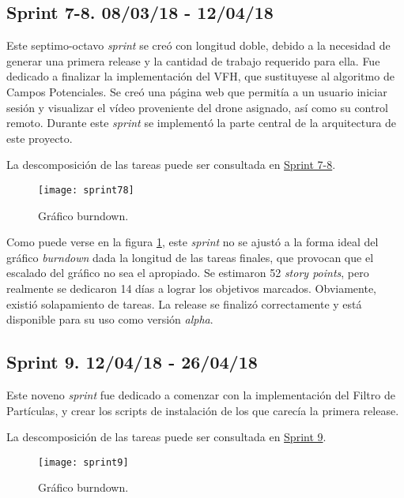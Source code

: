 \subsection{Sprint 7-8. 08/03/18 - 12/04/18}

Este septimo-octavo \emph{sprint} se creó con longitud doble, debido a la necesidad de generar una primera release y la cantidad de trabajo requerido para ella. Fue dedicado a finalizar la implementación del VFH, que sustituyese al algoritmo de Campos Potenciales. Se creó una página web que permitía a un usuario iniciar sesión y visualizar el vídeo proveniente del drone asignado, así como su control remoto.
Durante este \emph{sprint} se implementó la parte central de la arquitectura de este proyecto.

La descomposición de las tareas puede ser consultada en \href{https://github.com/mbm0089/gii_0_17.02_snsi/milestone/7?closed=1}{Sprint 7-8}.

\begin{figure}[H]
	\centering
	\texttt{[image: sprint78]}
	\caption[Burndown Sprint 7-8]{Gráfico burndown.}\label{fig:sprint78}
\end{figure}

Como puede verse en la figura \ref{fig:sprint78}, este \emph{sprint} no se ajustó a la forma ideal del gráfico \emph{burndown} dada la longitud de las tareas finales, que provocan que el escalado del gráfico no sea el apropiado.
Se estimaron 52 \emph{story points}, pero realmente se dedicaron 14 días a lograr los objetivos marcados. Obviamente, existió solapamiento de tareas. La release se finalizó correctamente y está disponible para su uso como versión \emph{alpha}.

\subsection{Sprint 9. 12/04/18 - 26/04/18}

Este noveno \emph{sprint} fue dedicado a comenzar con la implementación del Filtro de Partículas, y crear los scripts de instalación de los que carecía la primera release.

La descomposición de las tareas puede ser consultada en \href{https://github.com/mbm0089/gii_0_17.02_snsi/milestone/8?closed=1}{Sprint 9}.

\begin{figure}[H]
	\centering
	\texttt{[image: sprint9]}
	\caption[Burndown Sprint 9]{Gráfico burndown.}\label{fig:sprint9}
\end{figure}

